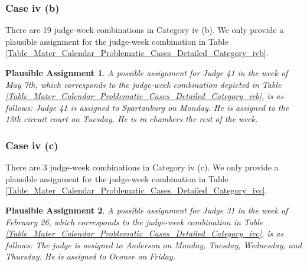 \documentclass[11pt, oneside]{article}   	%
\theoremstyle{ModifiedStyle}
\newtheorem{plausible_assignment}{Plausible Assignment}
\begin{document}
\subsubsection{Case iv (b)}
%
There are 19 judge-week combinations in Category iv (b). We only provide a plausible assignment for the judge-week combination in Table \ref{Table_Mater_Calendar_Problematic_Cases_Detailed_Category_ivb}.
%
\begin{plausible_assignment}
	A possible assignment for Judge 41 in the week of May 7th, which corresponds to the judge-week combination depicted in Table \ref{Table_Mater_Calendar_Problematic_Cases_Detailed_Category_ivb}, is as follows: Judge 41 is assigned to Spartanburg on Monday. He is assigned to the 13th circuit court on Tuesday. He is in chambers the rest of the week.
\end{plausible_assignment}
%
\subsubsection{Case iv (c)}
%
There are 3 judge-week combinations in Category iv (c). We only provide a plausible assignment for the judge-week combination in Table \ref{Table_Mater_Calendar_Problematic_Cases_Detailed_Category_ivc}.
%
\begin{plausible_assignment}
	A possible assignment for Judge 31 in the week of February 26, which corresponds to the judge-week combination in Table \ref{Table_Mater_Calendar_Problematic_Cases_Detailed_Category_ivc}, is as follows: The judge is assigned to Anderson on Monday, Tuesday, Wednesday, and Thursday. He is assigned to Oconee on Friday.
\end{plausible_assignment}
\end{document}

